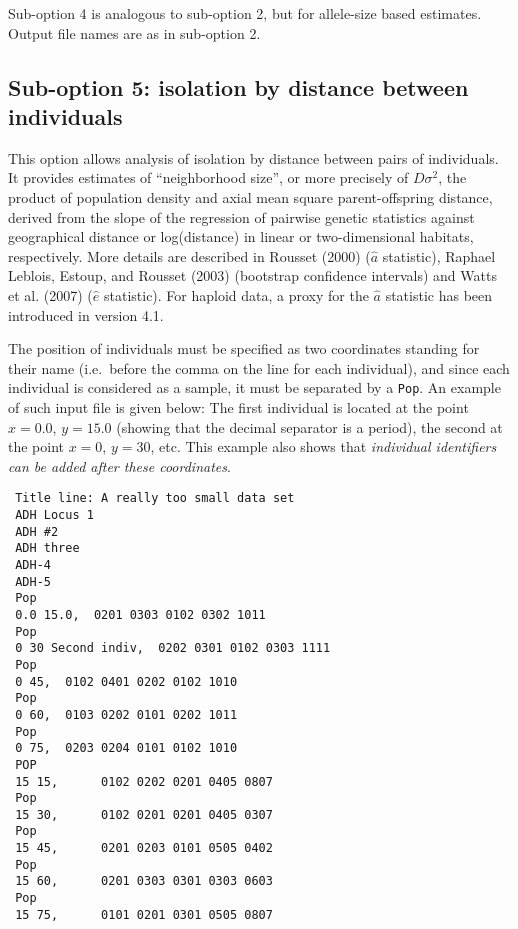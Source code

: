 \documentclass[
  12pt,
]{book}
\begin{document}
Sub-option 4 is analogous to sub-option 2, but for allele-size based estimates. Output file names are as in sub-option 2.

\hypertarget{sub-option-5-isolation-by-distance-between-individuals}{%
\subsection{Sub-option 5: isolation by distance between individuals}\label{sub-option-5-isolation-by-distance-between-individuals}}

This option allows analysis of isolation by distance between pairs of individuals. It provides estimates of ``neighborhood size'', or more precisely of \(D\sigma^2\), the product of population density and axial mean square parent-offspring distance, derived from the slope of the regression of pairwise genetic statistics against geographical distance or log(distance) in linear or two-dimensional habitats, respectively. More details are described in Rousset (2000) (\(\hat{a}\) statistic), Raphael Leblois, Estoup, and Rousset (2003) (bootstrap confidence intervals) and Watts et al. (2007) (\(\hat{e}\) statistic). For haploid data, a proxy for the \(\hat{a}\) statistic has been introduced in version 4.1.

The position of individuals must be specified as two coordinates standing for their name (i.e.~before the comma on the line for each individual), and since each individual is considered as a sample, it must be separated by a \texttt{Pop}. An example of such input file is given below: The first individual is located at the point \(x = 0.0\), \(y = 15.0\) (showing that the decimal separator is a period), the second at the point \(x = 0\), \(y =30\), etc. This example also shows that \emph{individual identifiers can be added after these coordinates}.

\begin{verbatim}
 Title line: A really too small data set
 ADH Locus 1
 ADH #2
 ADH three
 ADH-4
 ADH-5
 Pop
 0.0 15.0,  0201 0303 0102 0302 1011
 Pop
 0 30 Second indiv,  0202 0301 0102 0303 1111
 Pop
 0 45,  0102 0401 0202 0102 1010
 Pop
 0 60,  0103 0202 0101 0202 1011
 Pop
 0 75,  0203 0204 0101 0102 1010
 POP
 15 15,      0102 0202 0201 0405 0807
 Pop
 15 30,      0102 0201 0201 0405 0307
 Pop
 15 45,      0201 0203 0101 0505 0402
 Pop
 15 60,      0201 0303 0301 0303 0603
 Pop
 15 75,      0101 0201 0301 0505 0807
\end{verbatim}
\end{document}
